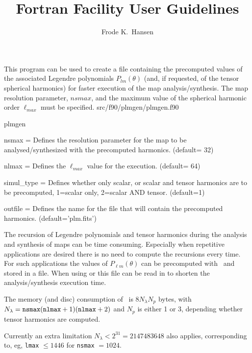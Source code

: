 
\sloppy


\title{\healpix Fortran Facility User Guidelines}
 \section[plmgen]{\nosectionname}
\label{fac:plmgen}
\author{Frode K.~Hansen}

\begin{facility}
{This program can be used to create a file containing 
the precomputed values of the associated Legendre polynomials
$P_{lm}(\theta)$ (and, if requested, of the tensor spherical harmonics) 
for faster execution of the \healpix map analysis/synthesis. 
The  map resolution parameter, $nsmax$,
and the maximum value of the spherical harmonic order $\ell_{max}$
must be specified.}
{src/f90/plmgen/plmgen.f90}
\end{facility}

\begin{f90facility}
{plmgen}
\end{f90facility}

\begin{qualifiers}
  \begin{qulist}{} %
    \item[{nsmax = }] Defines the resolution parameter for the map to 
be analysed/synthesized with the precomputed harmonics. 
	(default= 32)
    \item[{nlmax = }] Defines the $\ell_{max}$ value for the execution.
(default= 64)
     \item[{simul\_type = }] Defines whether only scalar, or scalar and 
tensor harmonics are to be precomputed, 1=scalar only, 2=scalar AND tensor.
(default=1)
\item[{outfile = }] Defines the name for the file that will 
contain the precomputed harmonics.
(default='plm.fits')
  \end{qulist}
\end{qualifiers}

\begin{codedescription}
{
The recursion of Legendre polynomials 
and tensor harmonics during the  analysis and synthesis 
of \healpix maps can be time consuming. 
Especially when repetitive applications are desired
there is no need to compute the recursions every time. 
For such applications the values of $P_{\ell m}(\theta)$  
can be precomputed with \thedocid\ 
and stored in a file. When using  or  
this file can be read in to 
shorten  the analysis/synthesis execution time. 

The memory (and disc) consumption of \thedocid\    is $8 N_\lambda N_p$ bytes, with
$N_\lambda = {\tt nsmax} ({\tt nlmax}+1)({\tt nlmax}+2)$ and
$N_p$ is either 1 or 3, depending whether tensor harmonics are computed. 

Currently an extra limitation $N_\lambda < 2^{31} = 2147483648$ also applies,
corresponding to, eg, {\tt lmax} $\le 1446$ for {\tt nsmax} $=1024$.}
\end{codedescription}

